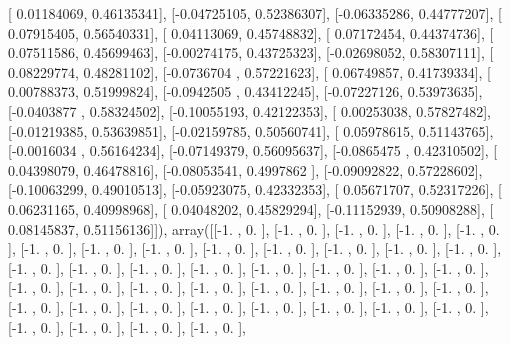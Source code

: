 \documentclass{article}
\begin{document}
       [ 0.01184069,  0.46135341],
       [-0.04725105,  0.52386307],
       [-0.06335286,  0.44777207],
       [ 0.07915405,  0.56540331],
       [ 0.04113069,  0.45748832],
       [ 0.07172454,  0.44374736],
       [ 0.07511586,  0.45699463],
       [-0.00274175,  0.43725323],
       [-0.02698052,  0.58307111],
       [ 0.08229774,  0.48281102],
       [-0.0736704 ,  0.57221623],
       [ 0.06749857,  0.41739334],
       [ 0.00788373,  0.51999824],
       [-0.0942505 ,  0.43412245],
       [-0.07227126,  0.53973635],
       [-0.0403877 ,  0.58324502],
       [-0.10055193,  0.42122353],
       [ 0.00253038,  0.57827482],
       [-0.01219385,  0.53639851],
       [-0.02159785,  0.50560741],
       [ 0.05978615,  0.51143765],
       [-0.0016034 ,  0.56164234],
       [-0.07149379,  0.56095637],
       [-0.0865475 ,  0.42310502],
       [ 0.04398079,  0.46478816],
       [-0.08053541,  0.4997862 ],
       [-0.09092822,  0.57228602],
       [-0.10063299,  0.49010513],
       [-0.05923075,  0.42332353],
       [ 0.05671707,  0.52317226],
       [ 0.06231165,  0.40998968],
       [ 0.04048202,  0.45829294],
       [-0.11152939,  0.50908288],
       [ 0.08145837,  0.51156136]]), array([[-1.        ,  0.        ],
       [-1.        ,  0.        ],
       [-1.        ,  0.        ],
       [-1.        ,  0.        ],
       [-1.        ,  0.        ],
       [-1.        ,  0.        ],
       [-1.        ,  0.        ],
       [-1.        ,  0.        ],
       [-1.        ,  0.        ],
       [-1.        ,  0.        ],
       [-1.        ,  0.        ],
       [-1.        ,  0.        ],
       [-1.        ,  0.        ],
       [-1.        ,  0.        ],
       [-1.        ,  0.        ],
       [-1.        ,  0.        ],
       [-1.        ,  0.        ],
       [-1.        ,  0.        ],
       [-1.        ,  0.        ],
       [-1.        ,  0.        ],
       [-1.        ,  0.        ],
       [-1.        ,  0.        ],
       [-1.        ,  0.        ],
       [-1.        ,  0.        ],
       [-1.        ,  0.        ],
       [-1.        ,  0.        ],
       [-1.        ,  0.        ],
       [-1.        ,  0.        ],
       [-1.        ,  0.        ],
       [-1.        ,  0.        ],
       [-1.        ,  0.        ],
       [-1.        ,  0.        ],
       [-1.        ,  0.        ],
       [-1.        ,  0.        ],
       [-1.        ,  0.        ],
       [-1.        ,  0.        ],
       [-1.        ,  0.        ],
       [-1.        ,  0.        ],
       [-1.        ,  0.        ],
       [-1.        ,  0.        ],
       [-1.        ,  0.        ],
\end{document}
